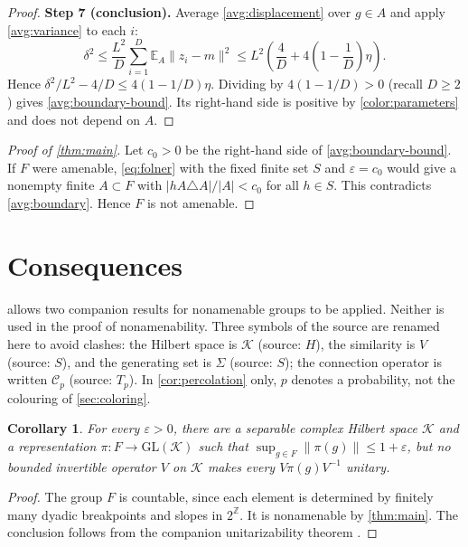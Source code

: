 \documentclass[11pt]{article}
\newcommand{\Z}{\mathbb Z}
\newcommand{\norm}[1]{\lVert #1\rVert}
\newtheorem{corollary}[theorem]{Corollary}
\theoremstyle{definition}
\numberwithin{equation}{section}
\newcommand{\step}[1]{\par\smallskip\noindent\textbf{Step #1.}\enspace}
\newcommand{\EA}{\mathbb E_A}
\begin{document}
\begin{proof}
\step{7 (conclusion)}
Average \eqref{avg:displacement} over \(g\in A\) and apply
\eqref{avg:variance} to each \(i\):
\[
  \delta^2
  \le\frac{L^2}{D}\sum_{i=1}^D\EA\norm{z_i-m}^2
  \le L^2\left(\frac4D+4\left(1-\frac1D\right)\eta\right).
\]
Hence \(\delta^2/L^2-4/D\le4(1-1/D)\eta\). Dividing by
\(4(1-1/D)>0\) (recall \(D\ge2\)) gives \eqref{avg:boundary-bound}. Its
right-hand side is positive by \eqref{color:parameters} and does not
depend on \(A\).
\end{proof}

\begin{proof}[Proof of \cref{thm:main}]
Let \(c_0>0\) be the right-hand side of \eqref{avg:boundary-bound}. If
\(F\) were amenable, \eqref{eq:folner} with the fixed finite set \(S\) and
\(\varepsilon=c_0\) would give a nonempty finite \(A\subset F\) with
\(|hA\triangle A|/|A|<c_0\) for all \(h\in S\). This contradicts
\cref{avg:boundary}. Hence \(F\) is not amenable.
\end{proof}

\section{Consequences}\label{sec:consequences}

 allows two companion results for nonamenable groups to be
applied. Neither is used in the proof of nonamenability.
Three symbols of the source are renamed here to avoid clashes:
the Hilbert space is \(\mathcal K\) (source: \(H\)), the similarity is
\(V\) (source: \(S\)), and the generating set is \(\Sigma\) (source: \(S\));
the connection operator is written \(\mathcal C_p\) (source: \(T_p\)).
In \cref{cor:percolation} only, \(p\) denotes a probability, not the
colouring of \cref{sec:coloring}.

\begin{corollary}\label{cor:nonunitarizable}
For every \(\varepsilon>0\), there are a separable complex Hilbert space
\(\mathcal K\) and a representation \(\pi:F\to\mathrm{GL}(\mathcal K)\)
such that \(\sup_{g\in F}\norm{\pi(g)}\le1+\varepsilon\), but no bounded
invertible operator \(V\) on \(\mathcal K\) makes every
\(V\pi(g)V^{-1}\) unitary.
\end{corollary}

\begin{proof}
The group \(F\) is countable, since each element is determined by finitely
many dyadic breakpoints and slopes in \(2^\Z\). It is nonamenable by
\cref{thm:main}. The conclusion follows from the companion
unitarizability theorem
\cite[Theorem~1.1]{OpenAIUnitarizability2026}.
\end{proof}
\end{document}
